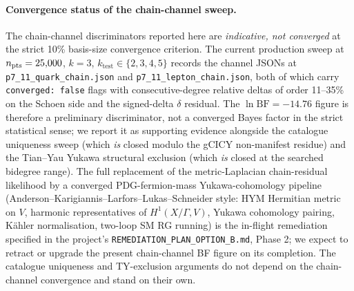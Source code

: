 ﻿\documentclass[reprint,amsmath,amssymb,aps,prd,longbibliography,floatfix]{revtex4-2}
\begin{document}
\paragraph{Convergence status of the chain-channel sweep.}
The chain-channel discriminators reported here are \emph{indicative,
not converged} at the strict 10\% basis-size convergence criterion.
The current production sweep at $n_{\rm pts}=25{,}000$, $k=3$,
$k_\mathrm{test} \in \{2,3,4,5\}$ records the channel JSONs at
\texttt{p7\_11\_quark\_chain.json} and
\texttt{p7\_11\_lepton\_chain.json}, both of which carry
\texttt{converged: false} flags with consecutive-degree relative
deltas of order 11--35\% on the Schoen side and the signed-delta
$\delta$ residual. The $\ln \mathrm{BF} = -14.76$ figure is therefore
a preliminary discriminator, not a converged Bayes factor in the
strict statistical sense; we report it as supporting evidence
alongside the catalogue uniqueness sweep (which \emph{is} closed
modulo the gCICY non-manifest residue) and the Tian--Yau Yukawa
structural exclusion (which \emph{is} closed at the searched
bidegree range). The full replacement of the metric-Laplacian
chain-residual likelihood by a converged PDG-fermion-mass
Yukawa-cohomology pipeline (Anderson--Karigiannis--Larfors--Lukas--Schneider
style: HYM Hermitian metric on $V$, harmonic representatives of
$H^1(X/\Gamma, V)$, Yukawa cohomology pairing, Kähler normalisation,
two-loop SM RG running) is the in-flight remediation specified in
the project's \texttt{REMEDIATION\_PLAN\_OPTION\_B.md}, Phase 2; we
expect to retract or upgrade the present chain-channel BF figure on
its completion. The catalogue uniqueness and TY-exclusion arguments
do not depend on the chain-channel convergence and stand on their
own.
\end{document}
